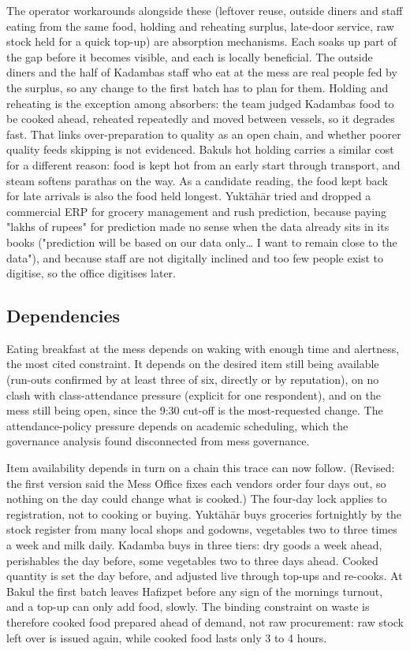 \documentclass[
  10pt,
  table]{article}
\begin{document}
The operator workarounds alongside these (leftover reuse, outside diners and staff eating from the same food, holding and reheating surplus, late-door service, raw stock held for a quick top-up) are absorption mechanisms. Each soaks up part of the gap before it becomes visible, and each is locally beneficial. The outside diners and the half of Kadamba\textquotesingle s staff who eat at the mess are real people fed by the surplus, so any change to the first batch has to plan for them. Holding and reheating is the exception among absorbers: the team judged Kadamba\textquotesingle s food to be cooked ahead, reheated repeatedly and moved between vessels, so it degrades fast. That links over-preparation to quality as an open chain, and whether poorer quality feeds skipping is not evidenced. Bakul\textquotesingle s hot holding carries a similar cost for a different reason: food is kept hot from an early start through transport, and steam softens parathas on the way. As a candidate reading, the food kept back for late arrivals is also the food held longest. Yuktāhār tried and dropped a commercial ERP for grocery management and rush prediction, because paying "lakhs of rupees" for prediction made no sense when the data already sits in its books ("prediction will be based on our data only\ldots{} I want to remain close to the data"), and because staff are not digitally inclined and too few people exist to digitise, so the office digitises later.

\subsection{Dependencies}\label{dependencies}

Eating breakfast at the mess depends on waking with enough time and alertness, the most cited constraint. It depends on the desired item still being available (run-outs confirmed by at least three of six, directly or by reputation), on no clash with class-attendance pressure (explicit for one respondent), and on the mess still being open, since the 9:30 cut-off is the most-requested change. The attendance-policy pressure depends on academic scheduling, which the governance analysis found disconnected from mess governance.

Item availability depends in turn on a chain this trace can now follow. (Revised: the first version said the Mess Office fixes each vendor\textquotesingle s order four days out, so nothing on the day could change what is cooked.) The four-day lock applies to registration, not to cooking or buying. Yuktāhār buys groceries fortnightly by the stock register from many local shops and godowns, vegetables two to three times a week and milk daily. Kadamba buys in three tiers: dry goods a week ahead, perishables the day before, some vegetables two to three days ahead. Cooked quantity is set the day before, and adjusted live through top-ups and re-cooks. At Bakul the first batch leaves Hafizpet before any sign of the morning\textquotesingle s turnout, and a top-up can only add food, slowly. The binding constraint on waste is therefore cooked food prepared ahead of demand, not raw procurement: raw stock left over is issued again, while cooked food lasts only 3 to 4 hours.
\end{document}
